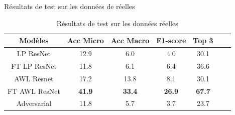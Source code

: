 \documentclass[11pt]{beamer}
\begin{document}
\begin{frame}{Résultats de test sur les données de réelles}
    \begin{table}[ht]
      \centering
        \begin{tabular}{ccccccc}
        \toprule
        Modèles & Acc Micro & Acc Macro & F1-score & Top 3 \\
        \midrule
        LP ResNet & 12.9 & 6.0 & 4.0 & 30.1 \\
        FT LP ResNet & 11.8 & 6.1 & 6.4 & 36.6 \\
        AWL Resnet & 17.2 & 13.8 & 8.1 & 30.1 \\
        FT AWL ResNet & \textbf{41.9} & \textbf{33.4} & \textbf{26.9} & \textbf{67.7} \\
        Adversarial & 11.8 & 5.7 & 3.7 & 23.7 \\
        \bottomrule
        \end{tabular}
        \caption{Résultats de test sur les données réelles}
        \label{tab: results_real}
    \end{table}
\end{frame}
\end{document}
